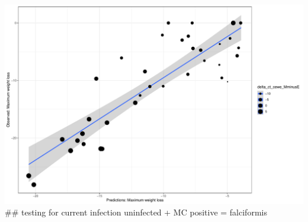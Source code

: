 \documentclass[
]{article}
\begin{document}
\includegraphics{8.Random_Forest_lab_gene_files/figure-latex/unnamed-chunk-9-3.pdf}
\#\# testing for current infection uninfected + MC positive =
falciformis
\end{document}
